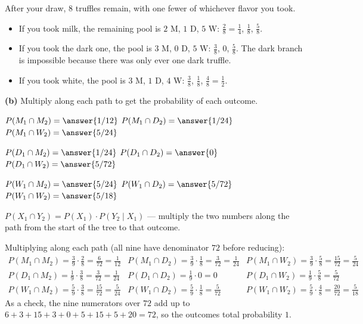 \documentclass[12pt]{ximera}
\begin{document}
\begin{problem}
\begin{prompt}
\begin{feedback}
After your draw, $8$ truffles remain, with one fewer of whichever flavor you took.
\begin{itemize}
\item If you took milk, the remaining pool is $2$ M, $1$ D, $5$ W:
      $\frac28=\frac14$, $\frac18$, $\frac58$.
\item If you took the dark one, the pool is $3$ M, $0$ D, $5$ W:
      $\frac38$, $0$, $\frac58$. The dark branch is impossible because there was
      only ever one dark truffle.
\item If you took white, the pool is $3$ M, $1$ D, $4$ W:
      $\frac38$, $\frac18$, $\frac48=\frac12$.
\end{itemize}
\end{feedback}
\end{prompt}

\begin{prompt}
\textbf{(b)} Multiply along each path to get the probability of each outcome.

$P(M_1\cap M_2)=\answer{1/12}$ \quad
$P(M_1\cap D_2)=\answer{1/24}$ \quad
$P(M_1\cap W_2)=\answer{5/24}$

\smallskip
$P(D_1\cap M_2)=\answer{1/24}$ \quad
$P(D_1\cap D_2)=\answer{0}$ \quad
$P(D_1\cap W_2)=\answer{5/72}$

\smallskip
$P(W_1\cap M_2)=\answer{5/24}$ \quad
$P(W_1\cap D_2)=\answer{5/72}$ \quad
$P(W_1\cap W_2)=\answer{5/18}$

\begin{hint}
$P(X_1\cap Y_2)=P(X_1)\cdot P(Y_2\mid X_1)$ --- multiply the two numbers along the
path from the start of the tree to that outcome.
\end{hint}

\begin{feedback}
Multiplying along each path (all nine have denominator $72$ before reducing):
\[
\begin{array}{lll}
P(M_1\cap M_2)=\frac39\cdot\frac28=\frac{6}{72}=\frac{1}{12} &
P(M_1\cap D_2)=\frac39\cdot\frac18=\frac{3}{72}=\frac{1}{24} &
P(M_1\cap W_2)=\frac39\cdot\frac58=\frac{15}{72}=\frac{5}{24}\\[4pt]
P(D_1\cap M_2)=\frac19\cdot\frac38=\frac{3}{72}=\frac{1}{24} &
P(D_1\cap D_2)=\frac19\cdot 0=0 &
P(D_1\cap W_2)=\frac19\cdot\frac58=\frac{5}{72}\\[4pt]
P(W_1\cap M_2)=\frac59\cdot\frac38=\frac{15}{72}=\frac{5}{24} &
P(W_1\cap D_2)=\frac59\cdot\frac18=\frac{5}{72} &
P(W_1\cap W_2)=\frac59\cdot\frac48=\frac{20}{72}=\frac{5}{18}
\end{array}
\]
As a check, the nine numerators over $72$ add up to
$6+3+15+3+0+5+15+5+20=72$, so the outcomes total probability $1$.
\end{feedback}
\end{prompt}


\end{problem}
\end{document}

